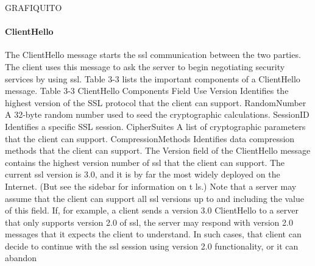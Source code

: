 GRAFIQUITO

\paragraph{ClientHello}
The ClientHello message starts the ssl communication between the
two parties. The client uses this message to ask the server to begin
negotiating security services by using ssl. Table 3-3 lists the important components of a ClientHello message.
Table 3-3 ClientHello Components
Field Use
Version Identifies the highest version of the SSL protocol that the client can support.
RandomNumber A 32-byte random number used to seed the
cryptographic calculations.
SessionID Identifies a specific SSL session.
CipherSuites A list of cryptographic parameters that the client can support.
CompressionMethods
Identifies data compression methods that the
client can support.
The Version field of the ClientHello message contains the highest
version number of ssl that the client can support. The current ssl
version is 3.0, and it is by far the most widely deployed on the Internet. (But see the sidebar for information on t ls.) Note that a server
may assume that the client can support all ssl versions up to and including the value of this field. If, for example, a client sends a version
3.0 ClientHello to a server that only supports version 2.0 of ssl, the
server may respond with version 2.0 messages that it expects the client to understand. In such cases, that client can decide to continue
with the ssl session using version 2.0 functionality, or it can abandon

